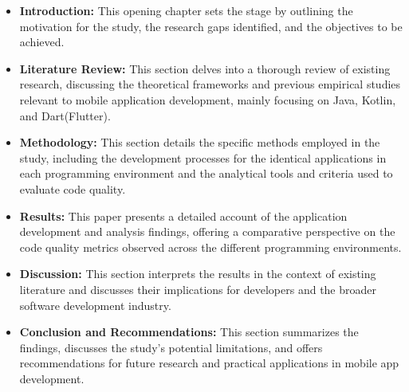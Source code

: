 \begin{itemize}
    \item \textbf{Introduction:} This opening chapter sets the stage by outlining the motivation for the study, the research gaps identified, and the objectives to be achieved.
    \item \textbf{Literature Review:} This section delves into a thorough review of existing research, discussing the theoretical frameworks and previous empirical studies relevant to mobile application development, mainly focusing on Java, Kotlin, and Dart(Flutter).
    \item \textbf{Methodology:} This section details the specific methods employed in the study, including the development processes for the identical applications in each programming environment and the analytical tools and criteria used to evaluate code quality. 
    \item \textbf{Results:} This paper presents a detailed account of the application development and analysis findings, offering a comparative perspective on the code quality metrics observed across the different programming environments.
    \item \textbf{Discussion:} This section interprets the results in the context of existing literature and discusses their implications for developers and the broader software development industry.
    \item \textbf{Conclusion and Recommendations:} This section summarizes the findings, discusses the study’s potential limitations, and offers recommendations for future research and practical applications in mobile app development.
\end{itemize}
